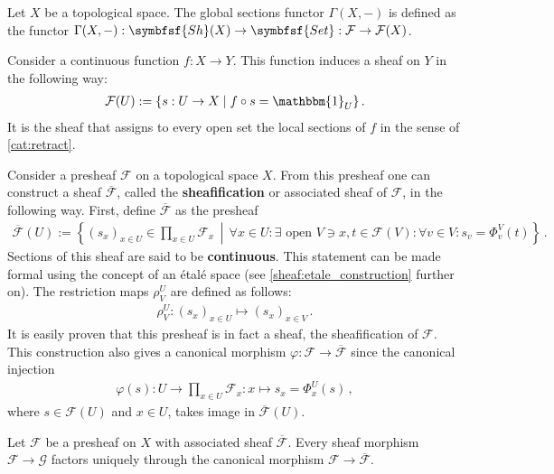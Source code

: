     \begin{example}\label{sheaf:global_sections_functor}
        Let $X$ be a topological space. The global sections functor $\Gamma(X,-)$ is defined as the functor $\Gamma(X,-):\symbfsf{Sh}(X)\rightarrow\symbfsf{Set}:\mathcal{F}\rightarrow\mathcal{F}(X)$.
    \end{example}
    \begin{example}
        Consider a continuous function $f:X\rightarrow Y$. This function induces a sheaf on $Y$ in the following way:
        \begin{gather}
            \mathcal{F}(U) := \{s:U\rightarrow X\mid f\circ s=\mathbbm{1}_U\}\,.
        \end{gather}
        It is the sheaf that assigns to every open set the local sections of $f$ in the sense of \cref{cat:retract}.
    \end{example}

    \begin{construct}
        Consider a presheaf $\mathcal{F}$ on a topological space $X$. From this presheaf one can construct a sheaf $\overline{\mathcal{F}}$, called the \textbf{sheafification} or associated sheaf of $\mathcal{F}$, in the following way. First, define $\overline{\mathcal{F}}$ as the presheaf
        \begin{gather}
            \overline{\mathcal{F}}(U) := \left\{(s_x)_{x\in U}\in\prod_{x\in U}\mathcal{F}_x\,\middle\vert\,\forall x\in U:\exists\text{ open }V\ni x,t\in\mathcal{F}(V):\forall v\in V:s_v = \Phi^V_v(t)\right\}\,.
        \end{gather}
        Sections of this sheaf are said to be \textbf{continuous}. This statement can be made formal using the concept of an \'etal\'e space (see \cref{sheaf:etale_construction} further on). The restriction maps $\rho^U_V$ are defined as follows:
        \begin{gather}
            \rho^U_V:(s_x)_{x\in U}\mapsto(s_x)_{x\in V}\,.
        \end{gather}
        It is easily proven that this presheaf is in fact a sheaf, the sheafification of $\mathcal{F}$. This construction also gives a canonical morphism $\varphi:\mathcal{F}\rightarrow\overline{\mathcal{F}}$ since the canonical injection
        \begin{gather}
            \varphi(s):U\rightarrow\prod_{x\in U}\mathcal{F}_x:x \mapsto s_x = \Phi^U_x(s)\,,
        \end{gather}
        where $s\in\mathcal{F}(U)$ and $x\in U$, takes image in $\overline{\mathcal{F}}(U)$.
    \end{construct}
    \begin{uproperty}
        Let $\mathcal{F}$ be a presheaf on $X$ with associated sheaf $\overline{\mathcal{F}}$. Every sheaf morphism $\mathcal{F}\rightarrow \mathcal{G}$ factors uniquely through the canonical morphism $\mathcal{F}\rightarrow\overline{\mathcal{F}}$.
    \end{uproperty}

